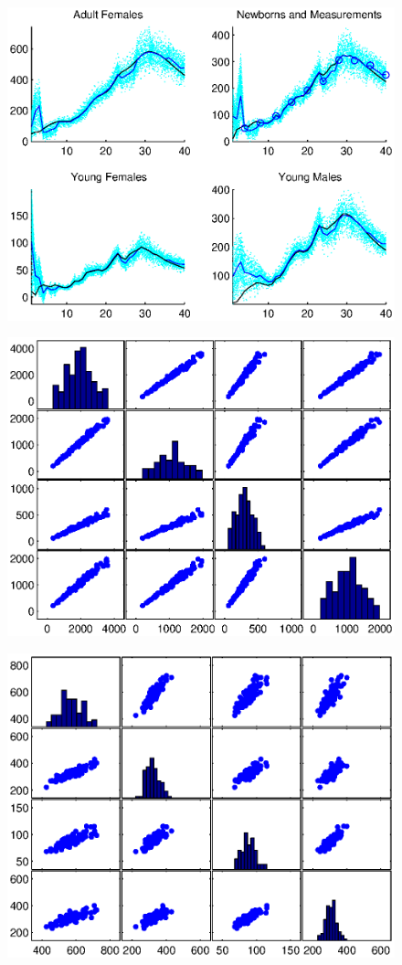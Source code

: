 \documentclass[fleqn, letterpaper]{amsart}
\begin{document}
\begin{figure}
\includegraphics[width=1\textwidth]{kf}
\end{figure}
\begin{figure}
\includegraphics[width=1\textwidth]{rol30cov}
\end{figure}
\begin{figure}
\includegraphics[width=1\textwidth]{rkf30cov}
\end{figure}
\end{document}
